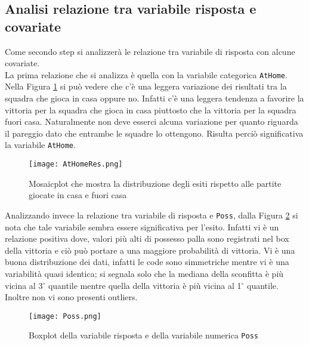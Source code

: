 \subsection{Analisi relazione tra variabile risposta e covariate}
Come secondo step si analizzerà le relazione tra variabile di risposta con alcune covariate.\\

La prima relazione che si analizza è quella con la variabile categorica \texttt{AtHome}. Nella Figura \ref{fig:AtHome} si può vedere che c'è una leggera variazione dei risultati tra la squadra che gioca in casa oppure no. Infatti c'è una leggera tendenza a favorire la vittoria per la squadra che gioca in casa piuttosto che la vittoria per la squadra fuori casa. Naturalmente non deve esserci alcuna variazione per quanto riguarda il pareggio dato che entrambe le squadre lo ottengono. Risulta perciò significativa la variabile \texttt{AtHome}.\\

\begin{figure}[htbp]
	\begin{center}
		\texttt{[image: AtHomeRes.png]}
		\caption{Mosaicplot che mostra la distribuzione degli esiti rispetto alle partite giocate in casa e fuori casa} \label{fig:AtHome}
	\end{center}
\end{figure}

Analizzando invece la relazione tra variabile di risposta e \texttt{Poss}, dalla Figura \ref{fig:Poss} si nota che tale variabile sembra essere significativa per l'esito. Infatti vi è un relazione positiva dove, valori più alti di possesso palla sono registrati nel box della vittoria e ciò può portare a una maggiore probabilità di vittoria. Vi è una buona distribuzione dei dati, infatti le code sono simmetriche mentre vi è una variabilità quasi identica; si segnala solo che la mediana della sconfitta è più vicina al 3$^{\circ}$ quantile mentre quella della vittoria è più vicina al 1$^{\circ}$ quantile. Inoltre non vi sono presenti outliers.\\

\begin{figure}[htbp]
	\begin{center}
		\texttt{[image: Poss.png]}
		\caption{Boxplot della variabile risposta e della variabile numerica \texttt{Poss} } \label{fig:Poss}
	\end{center}
\end{figure}

